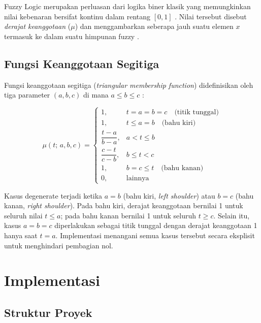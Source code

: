 \documentclass{article}
\begin{document}
Fuzzy Logic merupakan
perluasan dari logika biner klasik yang memungkinkan nilai kebenaran bersifat kontinu
dalam rentang $[0, 1]$ \cite{zaman2026fuzzyset}. Nilai tersebut disebut \textit{derajat keanggotaan}
($\mu$) dan menggambarkan seberapa jauh suatu elemen $x$ termasuk ke dalam suatu
himpunan fuzzy \cite{yen1999fuzzy}.

\subsection*{Fungsi Keanggotaan Segitiga}

Fungsi keanggotaan segitiga (\textit{triangular membership function}) didefinisikan
oleh tiga parameter $(a, b, c)$ di mana $a \le b \le c$
\cite{ross2004fuzzy}:

\begin{equation}
  \label{eq:segitiga}
  \mu(t;\, a, b, c) =
  \begin{cases}
    1, & t = a = b = c \quad \text{(titik tunggal)} \\[4pt]
    1, & t \le a = b \quad \text{(bahu kiri)} \\[4pt]
    \dfrac{t - a}{b - a}, & a < t \le b \\[6pt]
    \dfrac{c - t}{c - b}, & b \le t < c \\[6pt]
    1, & b = c \le t \quad \text{(bahu kanan)} \\[4pt]
    0, & \text{lainnya}
  \end{cases}
\end{equation}

Kasus degenerate terjadi ketika $a = b$ (bahu kiri, \textit{left shoulder}) atau
$b = c$ (bahu kanan, \textit{right shoulder}). Pada bahu kiri, derajat
keanggotaan bernilai 1 untuk seluruh nilai $t \le a$; pada bahu kanan bernilai 1
untuk seluruh $t \ge c$. Selain itu, kasus $a = b = c$ diperlakukan sebagai
titik tunggal dengan derajat keanggotaan 1 hanya saat $t = a$. Implementasi
menangani semua kasus tersebut secara eksplisit untuk menghindari pembagian nol.

\section*{Implementasi}

\subsection*{Struktur Proyek}
\end{document}
